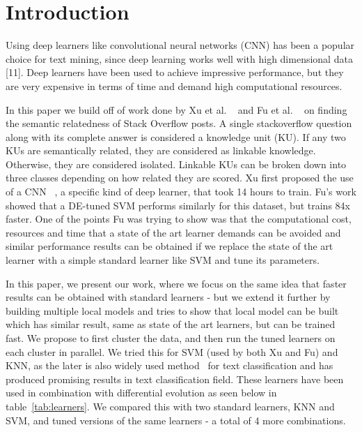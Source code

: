 \documentclass[sigconf]{acmart}
\theoremstyle{break}
\begin{document}




\maketitle

\section{Introduction}
    \label{sect:intro}
    Using deep learners like convolutional neural networks (CNN) has been a popular choice for text mining, since deep learning works well with high dimensional data [11]. Deep learners have been used to achieve impressive performance, but they are very expensive in terms of time and demand high computational resources.
    
    In this paper we build off of work done by Xu et al. ~\cite{xu2016predicting} and Fu et al. ~\cite{fu2017easy} on finding the semantic relatedness of Stack Overflow posts. A single stackoverflow question along with its complete answer is considered a knowledge unit (KU). If any two KUs are semantically related, they are considered as linkable knowledge. Otherwise, they are considered isolated. Linkable KUs can be broken down into three classes depending on how related they are scored. Xu first proposed the use of a CNN ~\cite{hubel1959receptive}, a specific kind of deep learner, that took 14 hours to train. Fu's work showed that a DE-tuned SVM performs similarly for this dataset, but trains 84x faster. One of the points Fu was trying to show was that the computational cost, resources and time that a state of the art learner demands can be avoided and similar performance results can be obtained if we replace the state of the art learner with a simple standard learner like SVM and tune its parameters. 
    
    In this paper, we present our work, where we focus on the same idea that faster results can be obtained with standard learners - but we extend it further by building multiple local models and tries to show that local model can be built which has similar result, same as state of the art learners, but can be trained fast. We propose to first cluster the data, and then run the tuned learners on each cluster in parallel. We tried this for SVM (used by both Xu and Fu) and KNN, as the later is also widely used method~\cite{bijalwan2014knn,wang2012improved} for text classification and has produced promising results in text classification field. These learners have been used in combination with differential evolution as seen below in table~\ref{tab:learners}. We compared this with two standard learners, KNN and SVM, and tuned versions of the same learners - a total of 4 more combinations. 
    
\end{document}
